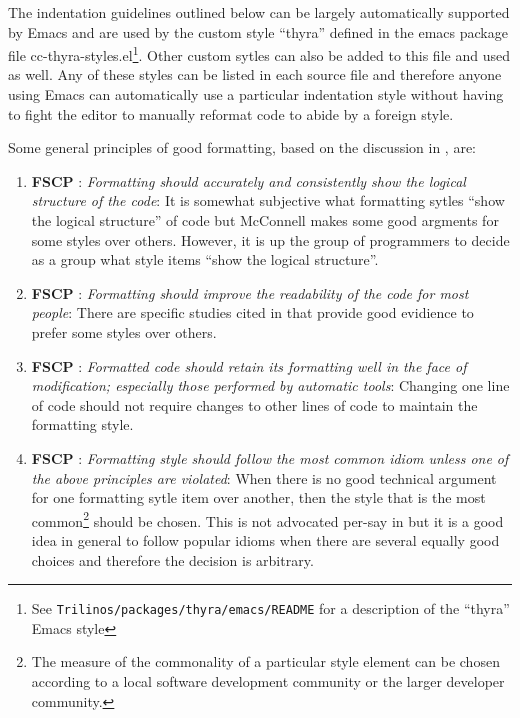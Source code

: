 The indentation guidelines outlined below can be largely automatically
supported by Emacs and are used by the custom style ``thyra'' defined in the
emacs package file cc-thyra-styles.el\footnote{See
{}\texttt{Trilinos/packages/thyra/emacs/README} for a description of the
``thyra'' Emacs style}.  Other custom sytles can also be added to this file
and used as well.  Any of these styles can be listed in each source file and
therefore anyone using Emacs can automatically use a particular indentation
style without having to fight the editor to manually reformat code to abide by
a foreign style.

Some general principles of good formatting, based on the discussion in
{}\cite[Section 31.1]{CodeComplete2nd04}, are:

\begin{enumerate}

{}\item{}\textbf{FSCP }:
{}\textit{Formatting should accurately and consistently show the logical
structure of the code}: It is somewhat subjective what formatting sytles
``show the logical structure'' of code but McConnell makes some good argments
for some styles over others.  However, it is up the group of programmers to
decide as a group what style items ``show the logical structure''.

{}\item{}\textbf{FSCP }:
{}\textit{Formatting should improve the readability of the code for most
people}: There are specific studies cited in {}\cite[Chapter
31]{CodeComplete2nd04} that provide good evidience to prefer some styles over
others.

{}\item{}\textbf{FSCP }:
{}\textit{Formatted code should retain its formatting well in the face of
modification; especially those performed by automatic tools}: Changing one
line of code should not require changes to other lines of code to maintain the
formatting style.

{}\item{}\textbf{FSCP }:
{}\textit{Formatting style should follow the most common idiom unless one
of the above principles are violated}: When there is no good technical
argument for one formatting sytle item over another, then the style that is
the most common\footnote{The measure of the commonality of a particular style
element can be chosen according to a local software development community or
the larger developer community.} should be chosen.  This is not advocated
per-say in {}\cite[Chapter 31]{CodeComplete2nd04} but it is a good idea in
general to follow popular idioms when there are several equally good choices
and therefore the decision is arbitrary.

\end{enumerate}

